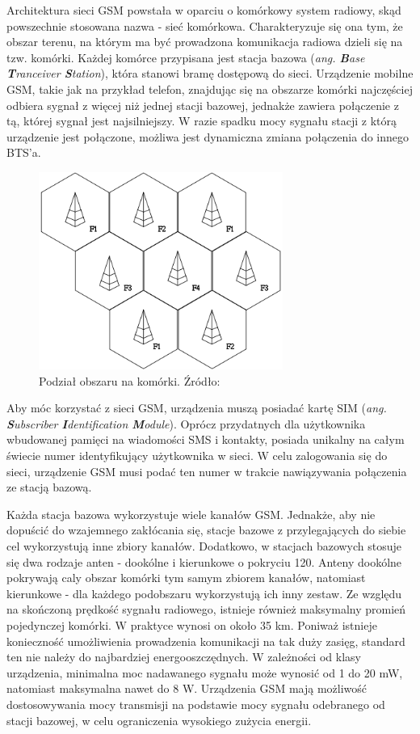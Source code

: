 Architektura sieci GSM powstała w oparciu o komórkowy system radiowy, skąd powszechnie stosowana nazwa - sieć komórkowa. Charakteryzuje się ona tym, że obszar terenu, na którym ma być prowadzona komunikacja radiowa dzieli się na tzw. komórki. Każdej komórce przypisana jest stacja bazowa (\textit{ang. \textbf{B}ase \textbf{T}ranceiver \textbf{S}tation}), która stanowi bramę dostępową do sieci. Urządzenie mobilne GSM, takie jak na przykład telefon, znajdując się na obszarze komórki najczęściej odbiera sygnał z więcej niż jednej stacji bazowej, jednakże zawiera połączenie z tą, której sygnał jest najsilniejszy. W razie spadku mocy sygnału stacji z którą urządzenie jest połączone, możliwa jest dynamiczna zmiana połączenia do innego BTS'a.

\begin{figure}[H]
	\centering
	\includegraphics[width=8cm]{img/theory/GSM/cell_structure.png}
	\caption{Podział obszaru na komórki. Źródło: \cite{GSM_wiki}}
	\label{fig:image_gsm_cells}
\end{figure}

Aby móc korzystać z sieci GSM, urządzenia muszą posiadać kartę SIM (\textit{ang. \textbf{S}ubscriber \textbf{I}dentification \textbf{M}odule}). Oprócz przydatnych dla użytkownika wbudowanej pamięci na wiadomości SMS i kontakty, posiada unikalny na całym świecie numer identyfikujący użytkownika w sieci. W celu zalogowania się do sieci, urządzenie GSM musi podać ten numer w trakcie nawiązywania połączenia ze stacją bazową. 

Każda stacja bazowa wykorzystuje wiele kanałów GSM. Jednakże, aby nie dopuścić do wzajemnego zakłócania się, stacje bazowe z przylegających do siebie cel wykorzystują inne zbiory kanałów. Dodatkowo, w stacjach bazowych stosuje się dwa rodzaje anten - dookólne i kierunkowe o pokryciu 120\degree. Anteny dookólne pokrywają caly obszar komórki tym samym zbiorem kanałów, natomiast kierunkowe - dla każdego podobszaru wykorzystują ich inny zestaw. Ze względu na skończoną prędkość sygnału radiowego, istnieje również maksymalny promień pojedynczej komórki. W praktyce wynosi on około 35 km. Poniważ istnieje konieczność umożliwienia prowadzenia komunikacji na tak duży zasięg, standard ten nie należy do najbardziej energooszczędnych. W zależności od klasy urządzenia, minimalna moc nadawanego sygnału może wynosić od 1 do 20 mW, natomiast maksymalna nawet do 8 W. Urządzenia GSM mają możliwość dostosowywania mocy transmisji na podstawie mocy sygnału odebranego od stacji bazowej, w celu ograniczenia  wysokiego zużycia energii. 

